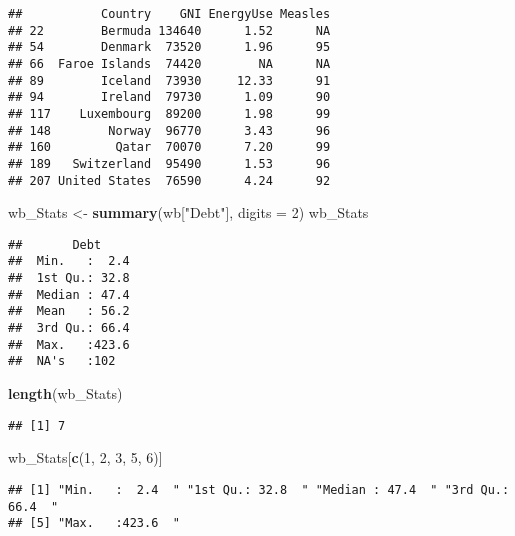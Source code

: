 \documentclass[
]{article}
\newenvironment{Shaded}{\begin{snugshade}}{\end{snugshade}}
\newcommand{\AttributeTok}[1]{\textcolor[rgb]{0.13,0.29,0.53}{#1}}
\newcommand{\DecValTok}[1]{\textcolor[rgb]{0.00,0.00,0.81}{#1}}
\newcommand{\FunctionTok}[1]{\textcolor[rgb]{0.13,0.29,0.53}{\textbf{#1}}}
\newcommand{\NormalTok}[1]{#1}
\newcommand{\OtherTok}[1]{\textcolor[rgb]{0.56,0.35,0.01}{#1}}
\newcommand{\StringTok}[1]{\textcolor[rgb]{0.31,0.60,0.02}{#1}}
\begin{document}
\begin{verbatim}
##           Country    GNI EnergyUse Measles
## 22        Bermuda 134640      1.52      NA
## 54        Denmark  73520      1.96      95
## 66  Faroe Islands  74420        NA      NA
## 89        Iceland  73930     12.33      91
## 94        Ireland  79730      1.09      90
## 117    Luxembourg  89200      1.98      99
## 148        Norway  96770      3.43      96
## 160         Qatar  70070      7.20      99
## 189   Switzerland  95490      1.53      96
## 207 United States  76590      4.24      92
\end{verbatim}

\begin{Shaded}
\begin{Highlighting}[]
\NormalTok{wb\_Stats }\OtherTok{\textless{}{-}} \FunctionTok{summary}\NormalTok{(wb[}\StringTok{"Debt"}\NormalTok{], }\AttributeTok{digits =} \DecValTok{2}\NormalTok{)}
\NormalTok{wb\_Stats}
\end{Highlighting}
\end{Shaded}

\begin{verbatim}
##       Debt      
##  Min.   :  2.4  
##  1st Qu.: 32.8  
##  Median : 47.4  
##  Mean   : 56.2  
##  3rd Qu.: 66.4  
##  Max.   :423.6  
##  NA's   :102
\end{verbatim}

\begin{Shaded}
\begin{Highlighting}[]
\FunctionTok{length}\NormalTok{(wb\_Stats)}
\end{Highlighting}
\end{Shaded}

\begin{verbatim}
## [1] 7
\end{verbatim}

\begin{Shaded}
\begin{Highlighting}[]
\NormalTok{wb\_Stats[}\FunctionTok{c}\NormalTok{(}\DecValTok{1}\NormalTok{, }\DecValTok{2}\NormalTok{, }\DecValTok{3}\NormalTok{, }\DecValTok{5}\NormalTok{, }\DecValTok{6}\NormalTok{)]}
\end{Highlighting}
\end{Shaded}

\begin{verbatim}
## [1] "Min.   :  2.4  " "1st Qu.: 32.8  " "Median : 47.4  " "3rd Qu.: 66.4  "
## [5] "Max.   :423.6  "
\end{verbatim}
\end{document}
